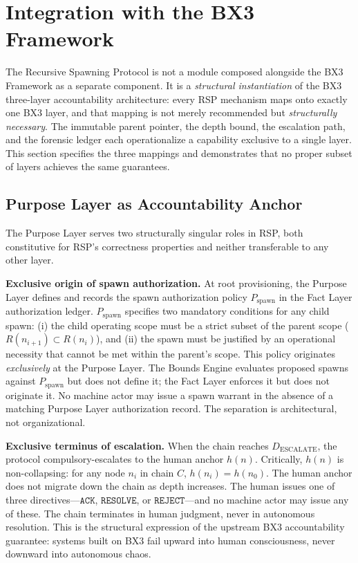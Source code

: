 \section{Integration with the BX3 Framework}
\label{sec:rs-integration}

The Recursive Spawning Protocol is not a module composed alongside the BX3 Framework as a separate component. It is a \emph{structural instantiation} of the BX3 three-layer accountability architecture: every RSP mechanism maps onto exactly one BX3 layer, and that mapping is not merely recommended but \emph{structurally necessary}. The immutable parent pointer, the depth bound, the escalation path, and the forensic ledger each operationalize a capability exclusive to a single layer. This section specifies the three mappings and demonstrates that no proper subset of layers achieves the same guarantees.

\subsection{Purpose Layer as Accountability Anchor}
\label{sec:rs-purpose-anchor}

The Purpose Layer serves two structurally singular roles in RSP, both constitutive for RSP's correctness properties and neither transferable to any other layer.

\medskip
\noindent\textbf{Exclusive origin of spawn authorization.} At root provisioning, the Purpose Layer defines and records the spawn authorization policy $P_{\mathrm{spawn}}$ in the Fact Layer authorization ledger. $P_{\mathrm{spawn}}$ specifies two mandatory conditions for any child spawn: (i) the child operating scope must be a strict subset of the parent scope ($R(n_{i+1}) \subset R(n_i)$), and (ii) the spawn must be justified by an operational necessity that cannot be met within the parent's scope. This policy originates \emph{exclusively} at the Purpose Layer. The Bounds Engine evaluates proposed spawns against $P_{\mathrm{spawn}}$ but does not define it; the Fact Layer enforces it but does not originate it. No machine actor may issue a spawn warrant in the absence of a matching Purpose Layer authorization record. The separation is architectural, not organizational.

\medskip
\noindent\textbf{Exclusive terminus of escalation.} When the chain reaches $D_{\mathrm{ESCALATE}}$, the protocol compulsory-escalates to the human anchor $h(n)$. Critically, $h(n)$ is non-collapsing: for any node $n_i$ in chain $C$, $h(n_i) = h(n_0)$. The human anchor does not migrate down the chain as depth increases. The human issues one of three directives---$\texttt{ACK}$, $\texttt{RESOLVE}$, or $\texttt{REJECT}$---and no machine actor may issue any of these. The chain terminates in human judgment, never in autonomous resolution. This is the structural expression of the upstream BX3 accountability guarantee: systems built on BX3 fail upward into human consciousness, never downward into autonomous chaos.

